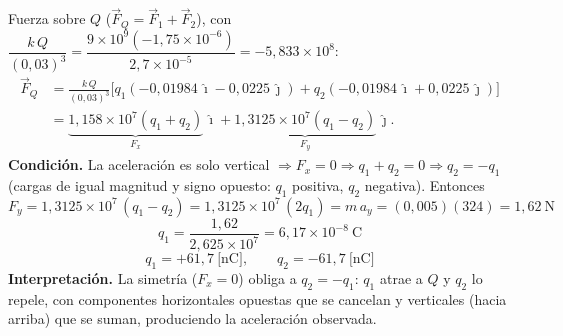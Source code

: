 \documentclass[12pt,letterpaper]{article}
\begin{document}
\medskip
\noindent Fuerza sobre $Q$ ($\vec F_Q=\vec F_1+\vec F_2$), con
$\dfrac{k\,Q}{(0{,}03)^3}=\dfrac{9\times10^9(-1{,}75\times10^{-6})}{2{,}7\times10^{-5}}=-5{,}833\times10^{8}$:
\begin{align*}
\vec F_Q &= \frac{k\,Q}{(0{,}03)^3}\Big[q_1(-0{,}01984\,\hat\imath-0{,}0225\,\hat\jmath)+q_2(-0{,}01984\,\hat\imath+0{,}0225\,\hat\jmath)\Big]\\[2pt]
&= \underbrace{1{,}158\times10^{7}(q_1+q_2)}_{F_x}\,\hat\imath + \underbrace{1{,}3125\times10^{7}(q_1-q_2)}_{F_y}\,\hat\jmath.
\end{align*}
\textbf{Condici\'on.} La aceleraci\'on es solo vertical $\Rightarrow F_x=0 \Rightarrow q_1+q_2=0 \Rightarrow q_2=-q_1$
(cargas de igual magnitud y signo opuesto: $q_1$ positiva, $q_2$ negativa). Entonces
\[
F_y = 1{,}3125\times10^{7}\,(q_1-q_2) = 1{,}3125\times10^{7}\,(2q_1) = m\,a_y = (0{,}005)(324) = 1{,}62\ \text{N}
\]
\[
q_1 = \frac{1{,}62}{2{,}625\times10^{7}} = 6{,}17\times10^{-8}\ \text{C}
\]
\[
\boxed{q_1 = +61{,}7\ \text{[nC]},\qquad q_2 = -61{,}7\ \text{[nC]}}
\]
\noindent\textbf{Interpretaci\'on.} La simetr\'ia ($F_x=0$) obliga a $q_2=-q_1$: $q_1$ atrae a $Q$ y $q_2$ lo repele, con componentes horizontales opuestas que se cancelan y verticales (hacia arriba) que se suman, produciendo la aceleraci\'on observada.
\end{document}
